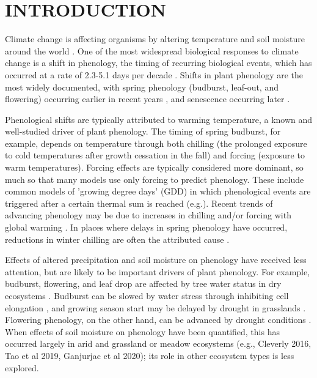 \documentclass{article}
\begin{document}
\section* {INTRODUCTION} 
\par Climate change is affecting organisms by altering temperature and soil moisture around the world \citep{parmesan2006,chen2011}. One of the most widespread biological responses to climate change is a shift in phenology, the timing of recurring biological events, which has occurred at a rate of 2.3-5.1 days per decade \citep{parmesan2006,poloczanska2013,root2003}. Shifts in plant phenology are the most widely documented, with spring phenology (budburst, leaf-out, and flowering) occurring earlier in recent years \citep{wolkovich2012}, and senescence occurring later \citep{taylor2008,delpierre2009}. 
\par Phenological shifts are typically attributed to warming temperature, a known and well-studied driver of plant phenology. The timing of spring budburst, for example, depends on temperature through both chilling (the prolonged exposure to cold temperatures after growth cessation in the fall) and forcing (exposure to warm temperatures). Forcing effects are typically considered more dominant, so much so that many models use only forcing to predict phenology. These include common models of 'growing degree days' (GDD) in which phenological events are triggered after a certain thermal sum is reached (e.g.).  Recent trends of advancing phenology may be due to increases in chilling and/or forcing with global warming \citep{fujisawa2010, ibanez2010,cook2012b}. In places where delays in spring phenology have occurred, reductions in winter chilling are often the attributed cause \citep{yu2010}. 
\par Effects of altered precipitation and soil moisture on phenology have received less attention, but are likely to be important drivers of plant phenology. For example, budburst, flowering, and leaf drop are affected by tree water status in dry ecosystems \citep[e.g., ][]{essiamah1986,reich1984, van1993}. Budburst can be slowed by water stress through inhibiting cell elongation \citep{essiamah1986}, and growing season start may be delayed by drought in grasslands \cite{cui2017}. Flowering phenology, on the other hand, can be advanced by drought conditions \citep{hamann2018}. When effects of soil moisture on phenology have been quantified, this has occurred largely in arid and grassland or meadow ecosystems (e.g., Cleverly 2016, Tao et al 2019, Ganjurjac et al 2020); its role in other ecosystem types is less explored. 
\end{document}

